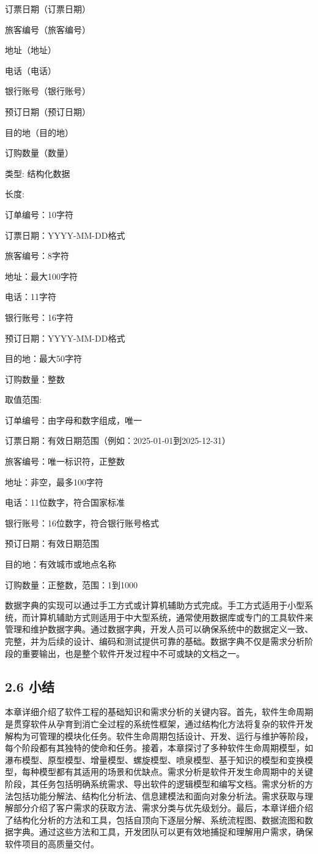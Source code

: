 订票日期（订票日期）

旅客编号（旅客编号）

地址（地址）

电话（电话）

银行账号（银行账号）

预订日期（预订日期）

目的地（目的地）

订购数量（数量）

类型: 结构化数据

长度:

订单编号：10字符

订票日期：YYYY-MM-DD格式

旅客编号：8字符

地址：最大100字符

电话：11字符

银行账号：16字符

预订日期：YYYY-MM-DD格式

目的地：最大50字符

订购数量：整数

取值范围:

订单编号：由字母和数字组成，唯一

订票日期：有效日期范围（例如：2025-01-01到2025-12-31）

旅客编号：唯一标识符，正整数

地址：非空，最多100字符

电话：11位数字，符合国家标准

银行账号：16位数字，符合银行账号格式

预订日期：有效日期范围

目的地：有效城市或地点名称

订购数量：正整数，范围：1到1000

数据字典的实现可以通过手工方式或计算机辅助方式完成。手工方式适用于小型系统，而计算机辅助方式则适用于中大型系统，通常使用数据库或专门的工具软件来管理和维护数据字典。通过数据字典，开发人员可以确保系统中的数据定义一致、完整，并为后续的设计、编码和测试提供可靠的基础。数据字典不仅是需求分析阶段的重要输出，也是整个软件开发过程中不可或缺的文档之一。

\hypertarget{ux5c0fux7ed3}{%
\subsection{2.6 小结}\label{ux5c0fux7ed3}}

本章详细介绍了软件工程的基础知识和需求分析的关键内容。首先，软件生命周期是贯穿软件从孕育到消亡全过程的系统性框架，通过结构化方法将复杂的软件开发解构为可管理的模块化任务。软件生命周期包括设计、开发、运行与维护等阶段，每个阶段都有其独特的使命和任务。接着，本章探讨了多种软件生命周期模型，如瀑布模型、原型模型、增量模型、螺旋模型、喷泉模型、基于知识的模型和变换模型，每种模型都有其适用的场景和优缺点。需求分析是软件开发生命周期中的关键阶段，其任务包括明确系统需求、导出软件的逻辑模型和编写文档。需求分析的方法包括功能分解法、结构化分析法、信息建模法和面向对象分析法。需求获取与理解部分介绍了客户需求的获取方法、需求分类与优先级划分。最后，本章详细介绍了结构化分析的方法和工具，包括自顶向下逐层分解、系统流程图、数据流图和数据字典。通过这些方法和工具，开发团队可以更有效地捕捉和理解用户需求，确保软件项目的高质量交付。
